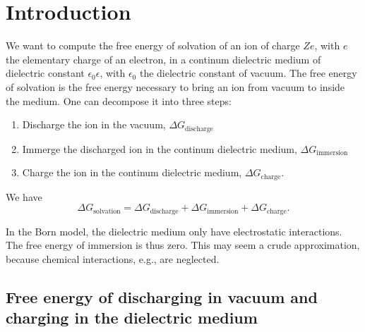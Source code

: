 \documentclass[aps,prl,preprint,groupedaddress]{revtex4-1}
\begin{document}
\section{Introduction}

We want to compute the free energy of solvation of an ion of charge $Ze$, with $e$ the elementary charge of an electron, in a
continum dielectric medium of dielectric constant $\epsilon_0 \epsilon$, with $\epsilon_0$ the dielectric constant of vacuum.
The free energy of solvation is the free energy necessary to bring an ion from vacuum to inside the medium.
One can decompose it into three steps:
\begin{enumerate}
\item Discharge the ion in the vacuum, $\Delta G_{\text{discharge}}$
\item Immerge the discharged ion in the continum dielectric medium, $\Delta G_{\text{immersion}}$
\item Charge the ion in the continum dielectric medium, $\Delta G_{\text{charge}}$.
\end{enumerate}
We have
\begin{equation}
    \Delta G_{\text{solvation}} = \Delta G_{\text{discharge}} + \Delta G_{\text{immersion}} + \Delta G_{\text{charge}}.
\end{equation}

In the Born model, the dielectric medium only have electrostatic interactions. The free energy of immersion is thus zero.
This may seem a crude approximation, because chemical interactions, e.g., are neglected.

\subsection{Free energy of discharging in vacuum and charging in the dielectric medium}
\end{document}
